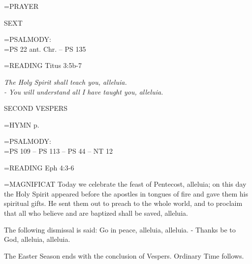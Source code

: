 \hangindent=\parindent \small{PRAYER 	}

\begin{flushleft}\normalsize SEXT\\\end{flushleft}

\hangindent=\parindent \small{PSALMODY:}\\
\hangindent=\parindent  PS 22 ant. Chr. -- PS 135\vspace{0.5em}

\hangindent=\parindent \small{READING}	Titus 3:5b-7 \textbf{}

\begin{center}
\textit{The Holy Spirit shall teach you, alleluia.\\
- You will understand all I have taught you, alleluia.}
\end{center}

\begin{flushleft}\normalsize SECOND VESPERS\\\end{flushleft}

\hangindent=\parindent \small{\uppercase{HYMN} p.  \pageref{pentecost:firstHymn}\\}

\hangindent=\parindent \small{PSALMODY:}\\
\hangindent=\parindent  PS 109 -- PS 113 -- PS 44 -- NT 12\vspace{0.5em}

\hangindent=\parindent \small{READING}	Eph 4:3-6 \textbf{\\}

\hangindent=\parindent \small{MAGNIFICAT 	Today we celebrate the feast of Pentecost, alleluia; on this day the Holy Spirit appeared before the apostles in tongues of fire and gave them his spiritual gifts. He sent them out to preach to the whole world, and to proclaim that all who believe and are baptized shall be saved, alleluia.\\}

The following dismissal is said:
Go in peace, alleluia, alleluia.
- Thanks be to God, alleluia, alleluia.

The Easter Season ends with the conclusion of Vespers.
Ordinary Time follows.
